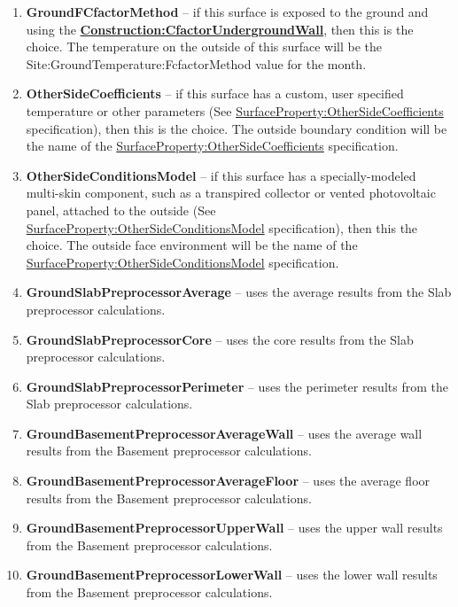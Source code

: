 \begin{enumerate}
  \item
    \textbf{GroundFCfactorMethod} -- if this surface is exposed to the ground and using the \textbf{\hyperref[constructioncfactorundergroundwall]{Construction:CfactorUndergroundWall}}, then this is the choice. The temperature on the outside of this surface will be the Site:GroundTemperature:FcfactorMethod value for the month.
  \item
    \textbf{OtherSideCoefficients} -- if this surface has a custom, user specified temperature or other parameters (See \hyperref[surfacepropertyothersidecoefficients]{SurfaceProperty:OtherSideCoefficients} specification), then this is the choice. The outside boundary condition will be the name of the \hyperref[surfacepropertyothersidecoefficients]{SurfaceProperty:OtherSideCoefficients} specification.
  \item
    \textbf{OtherSideConditionsModel} -- if this surface has a specially-modeled multi-skin component, such as a transpired collector or vented photovoltaic panel, attached to the outside (See \hyperref[surfacepropertyothersideconditionsmodel]{SurfaceProperty:OtherSideConditionsModel} specification), then this the choice. The outside face environment will be the name of the \hyperref[surfacepropertyothersideconditionsmodel]{SurfaceProperty:OtherSideConditionsModel} specification.
  \item
    \textbf{GroundSlabPreprocessorAverage} -- uses the average results from the Slab preprocessor calculations.
  \item
    \textbf{GroundSlabPreprocessorCore} -- uses the core results from the Slab preprocessor calculations.
  \item
    \textbf{GroundSlabPreprocessorPerimeter} -- uses the perimeter results from the Slab preprocessor calculations.
  \item
    \textbf{GroundBasementPreprocessorAverageWall} -- uses the average wall results from the Basement preprocessor calculations.
  \item
    \textbf{GroundBasementPreprocessorAverageFloor} -- uses the average floor results from the Basement preprocessor calculations.
  \item
    \textbf{GroundBasementPreprocessorUpperWall} -- uses the upper wall results from the Basement preprocessor calculations.
  \item
    \textbf{GroundBasementPreprocessorLowerWall} -- uses the lower wall results from the Basement preprocessor calculations.
\end{enumerate}

